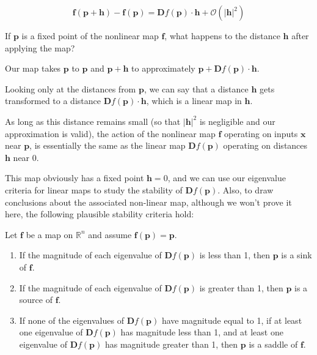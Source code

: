 \begin{equation}
{\mathbf f}({\mathbf p} + {\mathbf h}) - {\mathbf f}({\mathbf p}) = {\mathbf Df}({\mathbf p}) \cdot {\mathbf h} + \mathcal{O}\left(|{\mathbf h}|^2\right)
\end{equation} 

\begin{cue}
If $\mathbf p$ is a fixed point of the nonlinear map $\mathbf f$, what happens to the distance $\mathbf h$ after applying the map?
\end{cue}

Our map takes $\mathbf p$ to $\mathbf p$ and ${\mathbf p} + {\mathbf h}$ to approximately $\mathbf p + {\mathbf Df}({\mathbf p}) \cdot {\mathbf h}$.

Looking only at the distances from $\mathbf p$, we can say that a distance $\mathbf h$  gets transformed to a distance ${\mathbf Df}({\mathbf p}) \cdot {\mathbf h}$, which is a linear map in $\mathbf h$. 

As long as this distance remains small (so that $|{\mathbf h}|^2$ is negligible and our approximation is valid), the action of the nonlinear map $\mathbf f$ operating on inputs $\mathbf x$ near ${\mathbf p}$, is essentially the same as the linear map ${\mathbf Df}({\mathbf p})$ operating on distances $\mathbf h$ near 0.

This map obviously has a fixed point ${\mathbf h} = 0$, and we can use our eigenvalue criteria for linear maps to study the stability of ${\mathbf Df}({\mathbf p})$. Also, to draw conclusions about the associated non-linear map, although we won't prove it here, the following plausible stability criteria hold:

Let ${\mathbf f}$ be a map on $\mathbb{R}^n$ and assume ${\mathbf f}({\mathbf p})={\mathbf p}$.

\begin{enumerate}
\item
If the magnitude of each eigenvalue of ${\mathbf Df}({\mathbf p})$ is less than 1, then ${\mathbf p}$ is a sink of ${\mathbf f}$.
\item
If the magnitude of each eigenvalue of ${\mathbf Df}({\mathbf p})$ is greater than 1, then ${\mathbf p}$ is a source of ${\mathbf f}$.
\item
\noindent{}If none of the eigenvalues of ${\mathbf Df}({\mathbf p})$ have magnitude equal to 1, if at least one eigenvalue of ${\mathbf Df}({\mathbf p})$ has magnitude less than 1, and at least one eigenvalue of ${\mathbf Df}({\mathbf p})$ has magnitude greater than 1, then ${\mathbf p}$ is a saddle of ${\mathbf f}$.
\end{enumerate}

